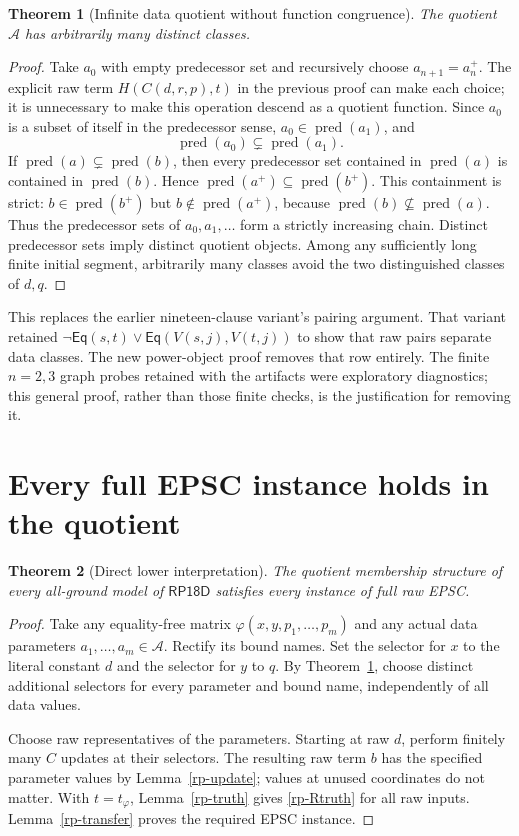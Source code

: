 \documentclass[11pt]{article}
\newtheorem{theorem}{Theorem}[section]
\newcommand{\Eq}{\mathsf{Eq}}
\newcommand{\RP}{\mathsf{RP18D}}
\begin{document}
\begin{theorem}[Infinite data quotient without function congruence]\label{rp-many}
The quotient $\mathcal A$ has arbitrarily many distinct classes.
\end{theorem}
\begin{proof}
Take $a_0$ with empty predecessor set and recursively choose
$a_{n+1}=a_n^+$. The explicit raw term $H(C(d,r,p),t)$ in the previous
proof can make each choice; it is unnecessary to make this operation
descend as a quotient function. Since $a_0$ is a subset of itself in
the predecessor sense, $a_0\in\operatorname{pred}(a_1)$, and
\[
 \operatorname{pred}(a_0)\subsetneq\operatorname{pred}(a_1).
\]
If $\operatorname{pred}(a)\subsetneq\operatorname{pred}(b)$, then
every predecessor set contained in $\operatorname{pred}(a)$ is
contained in $\operatorname{pred}(b)$. Hence
$\operatorname{pred}(a^+)\subseteq\operatorname{pred}(b^+)$.
This containment is strict: $b\in\operatorname{pred}(b^+)$ but
$b\notin\operatorname{pred}(a^+)$, because
$\operatorname{pred}(b)\nsubseteq\operatorname{pred}(a)$.
Thus the predecessor sets of $a_0,a_1,\ldots$ form a strictly
increasing chain. Distinct predecessor sets imply distinct quotient
objects. Among any sufficiently long finite initial segment, arbitrarily
many classes avoid the two distinguished classes of $d,q$.
\end{proof}

This replaces the earlier nineteen-clause variant's pairing argument.
That variant retained
$\neg\Eq(s,t)\lor\Eq(V(s,j),V(t,j))$ to show that raw pairs
separate data classes. The new power-object proof removes that row
entirely. The finite $n=2,3$ graph probes retained with the artifacts
were exploratory diagnostics; this general proof, rather than those
finite checks, is the justification for removing it.

\section{Every full EPSC instance holds in the quotient}

\begin{theorem}[Direct lower interpretation]\label{rp-lower}
The quotient membership structure of every all-ground model of $\RP$
satisfies every instance of full raw EPSC.
\end{theorem}
\begin{proof}
Take any equality-free matrix $\varphi(x,y,p_1,\ldots,p_m)$ and any
actual data parameters $a_1,\ldots,a_m\in\mathcal A$. Rectify its
bound names. Set the selector for $x$ to the literal constant $d$ and
the selector for $y$ to $q$. By Theorem~\ref{rp-many}, choose distinct
additional selectors for every parameter and bound name, independently
of all data values.

Choose raw representatives of the parameters. Starting at raw $d$,
perform finitely many $C$ updates at their selectors. The resulting
raw term $b$ has the specified parameter values by
Lemma~\ref{rp-update}; values at unused coordinates do not matter.
With $t=t_\varphi$, Lemma~\ref{rp-truth} gives
\eqref{rp-Rtruth} for all raw inputs. Lemma~\ref{rp-transfer} proves
the required EPSC instance.
\end{proof}
\end{document}
